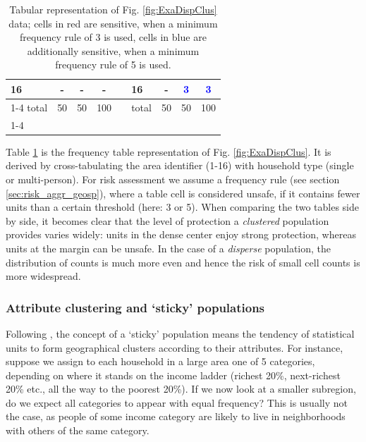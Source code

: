 \begin{table}[H]
\begin{tabular}{|l|cc|c|  c  |l|cc|c|}
        16 & -  & -  & -  &  & 16 & - & \textcolor{blue}{3} & \textcolor{blue}{3}  \\
        \cline{1-4} \cline{6-9}
        \cline{1-4} \cline{6-9}
        total & 50 & 50 & 100 & & total & 50 & 50 & 100\\ 
        \cline{1-4} \cline{6-9}
    \end{tabular}
    \caption{Tabular representation of Fig. \ref{fig:ExaDispClus} data; cells in red are sensitive, when a minimum frequency rule of 3 is used, cells in blue are additionally sensitive, when a minimum frequency rule of 5 is used.}
    \label{tab:ExaDispClus}
\end{table}

Table \ref{tab:ExaDispClus} is the frequency table representation of Fig. \ref{fig:ExaDispClus}. It is derived by cross-tabulating the area identifier (1-16) with household type (single or multi-person). For risk assessment we assume a frequency rule (see section \ref{sec:risk_aggr_geosp}), where a table cell is considered unsafe, if it contains fewer units than a certain threshold (here: 3 or 5). 
When comparing the two tables side by side, it becomes clear that the level of protection a \emph{clustered} population provides varies widely: units in the dense center enjoy strong protection, whereas units at the margin can be unsafe. 
In the case of a \emph{disperse} population, the distribution of counts is much more even and hence the risk of small cell counts is more widespread.

\subsubsection{Attribute clustering and `sticky' populations}

Following \cite{ElliotEtAl1998}, the concept of a `sticky' population means the tendency of statistical units to form geographical clusters according to their attributes. For instance, suppose we assign to each household in a large area one of 5 categories, depending on where it stands on the income ladder (richest 20\%, next-richest 20\% etc., all the way to the poorest 20\%). If we now look at a smaller subregion, do we expect all categories to appear with equal frequency? This is usually not the case, as people of some income category are likely to live in neighborhoods with others of the same category.

